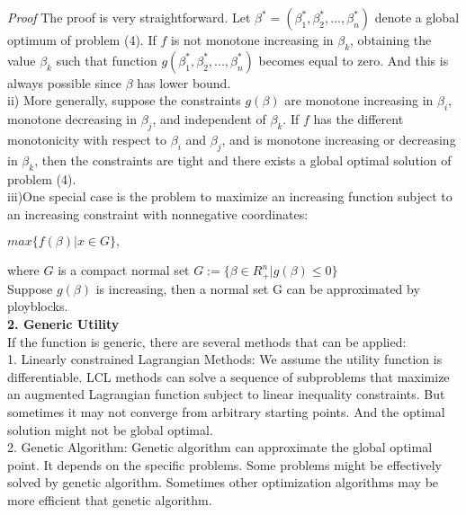 \documentclass{article} %
\begin{document}
\hspace*{1em}\textit{Proof}   The proof is very straightforward. Let $\beta^* = (\beta^*_1, \beta^*_2, ..., \beta^*_n)$ denote a global optimum of problem (4). If $f$  is not monotone increasing in $\beta_k$, obtaining the value $\beta_k$ such that function $g(\beta^*_1, \beta^*_2, ..., \beta^*_n)$ becomes equal to zero. And this is always possible since $\beta$ has lower bound.\\
\hspace*{1em}ii) More generally, suppose the constraints $g(\beta)$ are monotone increasing in $\beta_i$, monotone decreasing in $\beta_j$, and independent of $\beta_k$. If $f$ has the different monotonicity with respect to $\beta_i$ and $\beta_j$, and is monotone increasing or decreasing in $\beta_k$, then the constraints are tight and there exists a global optimal solution of problem (4).\\
\hspace*{1em}iii)One special case is the problem to maximize an increasing function subject to an increasing constraint with nonnegative coordinates:\\
\centerline{$max\{f(\beta)| x\in G\},$}
\hspace*{1em}where $G$ is a compact normal set $G:= \{ \beta\in R^n_+|g(\beta)\leq0\}$\\
\hspace*{1em}Suppose $g(\beta)$ is increasing, then a normal set G can be approximated by ployblocks.\\
\hspace*{1em}\textbf{2. Generic Utility}\\
\hspace*{1em}If the function is generic, there are several methods that can be applied:\\
\hspace*{1em}1. Linearly constrained Lagrangian Methods: We assume the utility function is differentiable. LCL methods can solve a sequence of subproblems that maximize an augmented Lagrangian function subject to linear inequality constraints. But sometimes it may not converge from arbitrary starting points. And the optimal solution might not be global optimal.\\
\hspace*{1em}2. Genetic Algorithm: Genetic algorithm can approximate the global optimal point. It depends on the specific problems. Some problems might be effectively solved by genetic algorithm. Sometimes other optimization algorithms may be more efficient that genetic algorithm.\\
\end{document}
